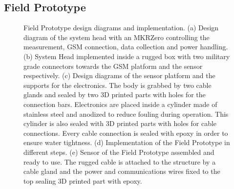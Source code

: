 \documentclass[journal,twoside,web]{ieeecolor}
\begin{document}
\subsection{Field Prototype}
\label{ssec:fieldProto}
\begin{figure}[!t]
\centering
{}
\caption{Field Prototype design diagrams and implementation. (a) Design diagram of the system head with an MKRZero controlling the measurement, GSM connection, data collection and power handling. (b) System Head implemented inside a rugged box with two military grade connectors towards the GSM platform and the sensor respectively. (c) Design diagrams of the sensor platform and the supports for the electronics. The body is grabbed by two cable glands and sealed by two 3D printed parts with holes for the connection bars. Electronics are placed inside a cylinder made of stainless steel and anodized to reduce fouling during operation. This cylinder is also sealed with 3D printed parts with holes for cable connections. Every cable connection is sealed with epoxy in order to ensure water tightness. (d) Implementation of the Field Prototype in different steps. (e) Sensor of the Field Prototype assembled and ready to use. The rugged cable is attached to the structure by a cable gland and the power and communications wires fixed to the top sealing 3D printed part with epoxy.}
\label{fig:measSet_3}
\end{figure}
\end{document}
